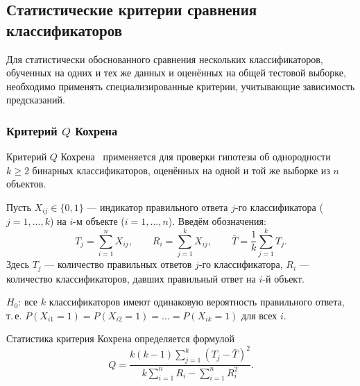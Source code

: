 \subsection{Статистические критерии сравнения классификаторов}
\label{subsec:statistical-tests}

Для статистически обоснованного сравнения нескольких классификаторов,
обученных на одних и тех же данных и оценённых на общей тестовой выборке,
необходимо применять специализированные критерии, учитывающие зависимость
предсказаний.

\subsubsection{Критерий $Q$ Кохрена}
\label{subsubsec:cochran}

Критерий $Q$ Кохрена~\cite{cochran1950comparison} применяется для проверки
гипотезы об однородности $k \geqslant 2$ бинарных классификаторов,
оценённых на одной и той же выборке из $n$ объектов.

Пусть $X_{ij} \in \{0, 1\}$ --- индикатор правильного ответа $j$-го
классификатора ($j = 1, \ldots, k$) на $i$-м объекте ($i = 1, \ldots, n$).
Введём обозначения:
\begin{equation}
    T_j = \sum_{i=1}^{n} X_{ij}, \qquad
    R_i = \sum_{j=1}^{k} X_{ij}, \qquad
    \bar{T} = \frac{1}{k}\sum_{j=1}^{k} T_j.
    \label{eq:cochran-notation}
\end{equation}
Здесь $T_j$ --- количество правильных ответов $j$-го классификатора,
$R_i$ --- количество классификаторов, давших правильный ответ на $i$-й объект.

\begin{definition}
\label{def:cochran-h0}
$H_0$: все $k$ классификаторов имеют одинаковую вероятность правильного
ответа, т.\,е.
$P(X_{i1} = 1) = P(X_{i2} = 1) = \ldots = P(X_{ik} = 1)$
для всех $i$.
\end{definition}

Статистика критерия Кохрена определяется формулой
\begin{equation}
    Q = \frac{k(k-1)\displaystyle\sum_{j=1}^{k}(T_j - \bar{T})^{2}}
             {k\displaystyle\sum_{i=1}^{n}R_i
              - \displaystyle\sum_{i=1}^{n}R_i^{2}}.
    \label{eq:cochran-Q}
\end{equation}

